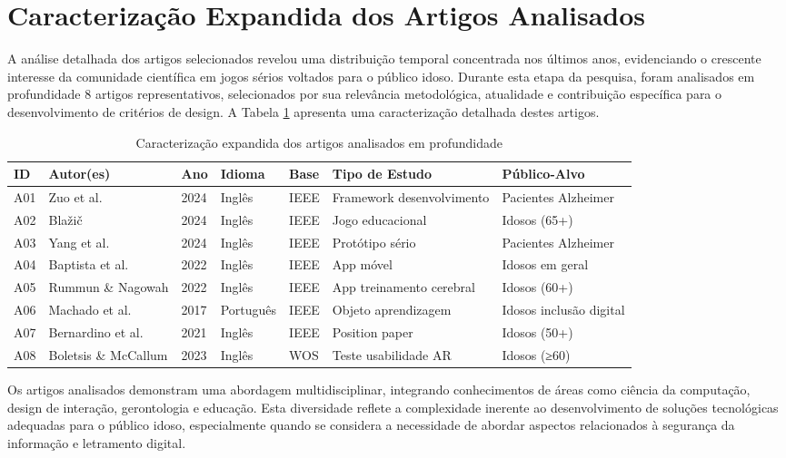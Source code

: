 \section{Caracterização Expandida dos Artigos Analisados}
\label{sec:caracterizacao_expandida}

A análise detalhada dos artigos selecionados revelou uma distribuição temporal concentrada nos últimos anos, evidenciando o crescente interesse da comunidade científica em jogos sérios voltados para o público idoso. Durante esta etapa da pesquisa, foram analisados em profundidade 8 artigos representativos, selecionados por sua relevância metodológica, atualidade e contribuição específica para o desenvolvimento de critérios de design. A Tabela \ref{tab:caracterizacao_expandida} apresenta uma caracterização detalhada destes artigos.

\begin{table}[H]
\centering
\caption{Caracterização expandida dos artigos analisados em profundidade}
\label{tab:caracterizacao_expandida}
\begin{tabular}{p{1cm}p{2.5cm}p{1cm}p{1.5cm}p{1.5cm}p{3cm}p{3cm}}
\hline
\textbf{ID} & \textbf{Autor(es)} & \textbf{Ano} & \textbf{Idioma} & \textbf{Base} & \textbf{Tipo de Estudo} & \textbf{Público-Alvo} \\ \hline
A01 & Zuo et al. & 2024 & Inglês & IEEE & Framework desenvolvimento & Pacientes Alzheimer \\
A02 & Blažič & 2024 & Inglês & IEEE & Jogo educacional & Idosos (65+) \\
A03 & Yang et al. & 2024 & Inglês & IEEE & Protótipo sério & Pacientes Alzheimer \\
A04 & Baptista et al. & 2022 & Inglês & IEEE & App móvel & Idosos em geral \\
A05 & Rummun \& Nagowah & 2022 & Inglês & IEEE & App treinamento cerebral & Idosos (60+) \\
A06 & Machado et al. & 2017 & Português & IEEE & Objeto aprendizagem & Idosos inclusão digital \\
A07 & Bernardino et al. & 2021 & Inglês & IEEE & Position paper & Idosos (50+) \\
A08 & Boletsis \& McCallum & 2023 & Inglês & WOS & Teste usabilidade AR & Idosos (≥60) \\
\hline
\end{tabular}
\end{table}

Os artigos analisados demonstram uma abordagem multidisciplinar, integrando conhecimentos de áreas como ciência da computação, design de interação, gerontologia e educação. Esta diversidade reflete a complexidade inerente ao desenvolvimento de soluções tecnológicas adequadas para o público idoso, especialmente quando se considera a necessidade de abordar aspectos relacionados à segurança da informação e letramento digital.

